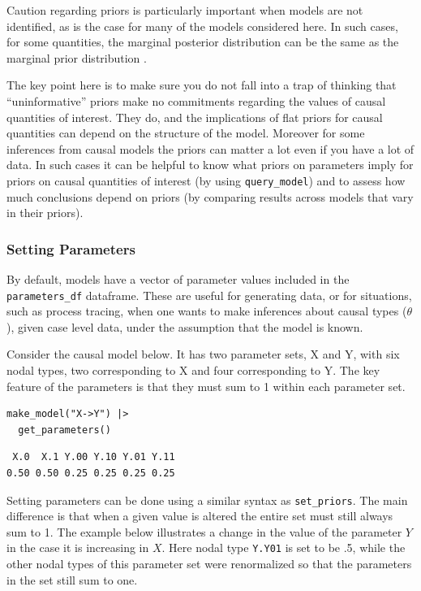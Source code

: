 \documentclass[
  article]{jss}
\begin{document}
Caution regarding priors is particularly important when models are not
identified, as is the case for many of the models considered here. In
such cases, for some quantities, the marginal posterior distribution can
be the same as the marginal prior distribution
\citep{poirier1998revising}.

The key point here is to make sure you do not fall into a trap of
thinking that ``uninformative'' priors make no commitments regarding the
values of causal quantities of interest. They do, and the implications
of flat priors for causal quantities can depend on the structure of the
model. Moreover for some inferences from causal models the priors can
matter a lot even if you have a lot of data. In such cases it can be
helpful to know what priors on parameters imply for priors on causal
quantities of interest (by using \texttt{query\_model}) and to assess
how much conclusions depend on priors (by comparing results across
models that vary in their priors).

\hypertarget{parameters}{%
\subsubsection{Setting Parameters}\label{parameters}}

By default, models have a vector of parameter values included in the
\texttt{parameters\_df} dataframe. These are useful for generating data,
or for situations, such as process tracing, when one wants to make
inferences about causal types (\(\theta\)), given case level data, under
the assumption that the model is known.

Consider the causal model below. It has two parameter sets, X and Y,
with six nodal types, two corresponding to X and four corresponding to
Y. The key feature of the parameters is that they must sum to 1 within
each parameter set.

\begin{verbatim}
make_model("X->Y") |> 
  get_parameters()
\end{verbatim}

\begin{verbatim}
 X.0  X.1 Y.00 Y.10 Y.01 Y.11 
0.50 0.50 0.25 0.25 0.25 0.25 
\end{verbatim}

Setting parameters can be done using a similar syntax as
\texttt{set\_priors}. The main difference is that when a given value is
altered the entire set must still always sum to 1. The example below
illustrates a change in the value of the parameter \(Y\) in the case it
is increasing in \(X\). Here nodal type \texttt{Y.Y01} is set to be .5,
while the other nodal types of this parameter set were renormalized so
that the parameters in the set still sum to one.
\end{document}
